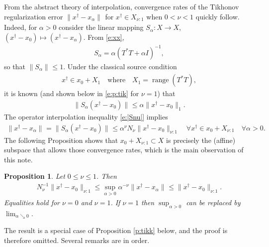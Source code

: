 \documentclass[10pt, a4paper]{iopart}
\newcommand{\norm}[2]{     \| #1       \|_{ #2 }}
\newtheorem{proposition}[lemma]{Proposition}
\theoremstyle{remark}
\theoremstyle{definition}
\begin{document}
%

From the abstract theory of interpolation,
convergence rates of 
the Tikhonov regularization error $\norm{x^\dag - x_\alpha}{}$
for $x^\dag \in X_{\nu:1}$ when $0 < \nu < 1$
quickly follow.
%
Indeed,
for $\alpha > 0$
consider the linear mapping
$S_\alpha : X \to X$,
$(x^\dag - x_0) \mapsto (x^\dag - x_\alpha)$.
%
From \eqref{e:xx},
\begin{align}
\label{e:Sa}
	S_\alpha = \alpha (T^* T + \alpha I)^{-1}
	,
\end{align}
so that
$\norm{S_\alpha }{} \leq 1$.
%
%
Under the classical source condition
\begin{align}
\label{e:cla}
	x^\dag \in 
	x_0 + X_1
	\quad\text{where}\quad
	X_1 = 
	\mathop{\mathrm{range}} (T^* T)
	,
\end{align}
it is known
(and shown below in \eqref{e:p:tik} for $\nu = 1$)
that
\begin{align}
\label{e:a01}
	\norm{ S_\alpha (x^\dag - x_0) }{} 
	\leq 
	\alpha \norm{x^\dag - x_0}{1}
	.
\end{align}
%
The operator interpolation inequality 
\eqref{e:|Snu|} implies
\begin{align}
\label{e:anu}
	\norm{ x^\dag - x_\alpha }{} 
	=
	\norm{ S_\alpha (x^\dag - x_0) }{}
	\leq
	\alpha^\nu
	N_\nu
	\norm{ x^\dag - x_0 }{\nu:1}
	\quad
	\forall x^\dag \in x_0 + X_{\nu:1}
	\quad
	\forall \alpha > 0
	.
\end{align}
%
The following Proposition
shows that $x_0 + X_{\nu:1} \subset X$ is precisely
the (affine) subspace that allows those convergence rates,
which is the main observation of this note.


\begin{proposition}
\label{p:tik}
	Let $0 \leq \nu \leq 1$. Then
	\begin{align}
	\label{e:p:tik}
		N_\nu^{-1}
		\norm{x^\dag - x_0}{\nu:1}
		\leq
		\sup_{\alpha > 0}
		\alpha^{-\nu}
		\norm{ x^\dag - x_\alpha }{}
		\leq
		\norm{x^\dag - x_0}{\nu:1}
		.
	\end{align}
	Equalities hold for $\nu = 0$ and $\nu = 1$.
	If $\nu = 1$ then $\sup_{\alpha > 0}$ can be replaced by $\lim_{\alpha \searrow 0}$.
\end{proposition}

%
The result is a special case of Proposition \ref{p:tikk} below,
and the proof is therefore omitted.
%
Several remarks are in order.
\end{document}
